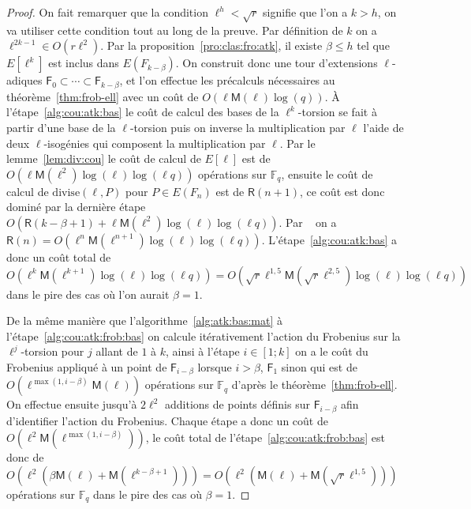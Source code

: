\documentclass[10pt,a4paper]{book}
\theoremstyle{plain}
\theoremstyle{definition}
\theoremstyle{definition}
\theoremstyle{definition}
\theoremstyle{definition}
\theoremstyle{remark}
\theoremstyle{remark}
\theoremstyle{definition}
\begin{document}
\begin{proof}
On fait remarquer que la condition $\ell^h < \sqrt{r}$ signifie que l'on
a $k>h$, on va utiliser cette condition tout au long de la preuve.
Par définition de $k$ on a $\ell^{2k-1} \in O(r\ell^2)$.
Par la proposition~\ref{pro:clas:fro:atk}, il existe $\beta \leqslant h$ tel que
$E[\ell^k]$ est inclus dans $E(F_{k-\beta})$. On construit donc une
tour d'extensions $\ell$-adiques $\mathsf{F}_0\subset\cdots\subset 
\mathsf{F}_{k-\beta}$, et l'on effectue les précalculs nécessaires au 
théorème~\ref{thm:frob-ell} avec un coût de $O(\ell\mathsf{M}(\ell)\log(q))$.
\`A l'étape~\ref{alg:cou:atk:bas} le coût de calcul des bases de la 
$\ell^k$-torsion se fait à partir d'une base de la $\ell$-torsion puis on 
inverse la multiplication par $\ell$ l'aide de deux $\ell$-isogénies qui 
composent la multiplication par $\ell$. Par le lemme~\ref{lem:div:cou} le coût 
de calcul de $E[\ell]$ est de 
$O(\ell \mathsf{M}(\ell^2)\log(\ell)\log(\ell q))$ opérations sur 
$\mathbb{F}_q$, ensuite le coût de calcul de $\mathrm{divise}(\ell,P)$ pour 
$P \in E(F_n)$ est de $\mathsf{R}(n+1)$, ce coût est donc dominé par la 
dernière étape
$O(\mathsf{R}(k-\beta+1)+\ell \mathsf{M}(\ell^2)\log(\ell)\log(\ell q))$.
Par ~\cite[Chapter~14.5]{vzGJG03} on a $\mathsf{R}(n)=
O(\ell^n\mathsf{M}(\ell^{n+1})\log(\ell)\log(\ell q))$. 
L'étape~\ref{alg:cou:atk:bas} a donc un coût total de $O(\ell^k \mathsf{M}
(\ell^{k+1})\log(\ell)\log(\ell q))=O(\sqrt{r}\ell^{1,5}\mathsf{M}(\sqrt{r}\ell^{2,5})\log(\ell)\log(\ell q))$ 
dans le pire des cas où l'on aurait $\beta=1$.

De la même manière que l'algorithme~\ref{alg:atk:bas:mat} à l'étape~\ref{alg:cou:atk:frob:bas} on 
calcule itérativement l'action du Frobenius sur la $\ell^j$-torsion pour $j$ 
allant de $1$ à $k$, ainsi à l'étape $i \in [1;k]$ on a le coût du Frobenius
appliqué à un point de $\mathsf{F}_{i-\beta}$ lorsque $i>\beta$, $\mathsf{F}_1$
sinon qui est de $O(\ell^{\max(1,i-\beta)}\mathsf{M}(\ell))$ opérations sur 
$\mathbb{F}_q$ d'après le théorème~\ref{thm:frob-ell}. On effectue ensuite 
jusqu'à $2\ell^2$ additions de points définis sur $\mathsf{F}_{i-\beta}$ afin 
d'identifier l'action du Frobenius. Chaque étape a donc un coût de 
$O(\ell^2 \mathsf{M}(\ell^{\max(1,i-\beta)}))$,
le coût total de l'étape~\ref{alg:cou:atk:frob:bas} est donc de 
$O(\ell^2(\beta \mathsf{M}(\ell)+\mathsf{M}(\ell^{k-\beta+1})))=
O(\ell^2( \mathsf{M}(\ell)+\mathsf{M}(\sqrt{r}\ell^{1,5})))$ 
opérations sur $\mathbb{F}_q$ dans le pire des cas où $\beta=1$.


\end{proof}
\end{document}
